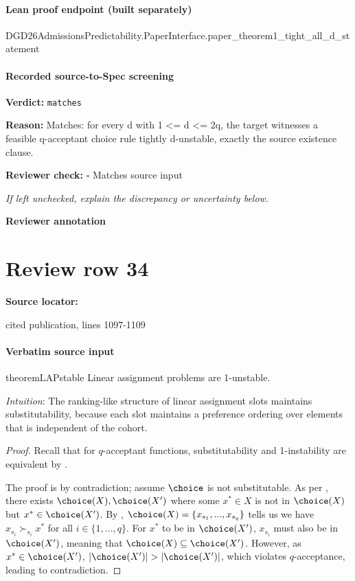 \documentclass[10pt]{article}
\newcommand{\reviewerbox}{%
  \par\noindent\fbox{\parbox{0.96\linewidth}{\rule{0pt}{0.38in}}}\par
}
\newcommand{\reviewmatch}[1]{%
  \par\noindent\textbf{Reviewer check:} $\square$\; #1\par
  \noindent\emph{If left unchecked, explain the discrepancy or uncertainty below.}\par
}
\begin{document}
\paragraph{Lean proof endpoint (built separately)}\begin{ReviewVerbatim}
DGD26AdmissionsPredictability.PaperInterface.paper_theorem1_tight_all_d_statement
\end{ReviewVerbatim}

\paragraph{Recorded source-to-Spec screening}
\textbf{Verdict:} \texttt{matches}
\\
{\raggedright
\textbf{Reason:} Matches:\allowbreak{} for every d with 1 <= d <= 2q, the target witnesses a feasible q-\allowbreak{}acceptant choice rule tightly d-\allowbreak{}unstable, exactly the source existence clause.\allowbreak{}
\par}
\reviewmatch{Matches source input}
\noindent\textbf{Reviewer annotation}\par
\reviewerbox
\clearpage
\hypertarget{source-claim-b3ee09f1e9e6b10d}{}
\section*{Review row 34}
\textbf{Source locator:} {\footnotesize\raggedright cited publication, lines 1097-\allowbreak{}1109\par}
\paragraph{Verbatim source input}
\begin{ReviewVerbatim}
\begin{restatable}{theorem}{LAPstable}
\label{thm:lap-unstable}
Linear assignment problems are 1-unstable.
\end{restatable}

\textit{Intuition}: The ranking-like structure of linear assignment slots maintains substitutability, because each slot maintains a  preference ordering over elements that is independent of the cohort.

\begin{proof}
Recall that for $q$-acceptant functions, substitutability and 1-instability are equivalent by .

The proof is by contradiction; assume $\choice$ is not substitutable. As per , there exists $\choice(X), \choice(X')$ where some $x^* \in X$ is not in $\choice(X)$ but $x^* \in \choice(X')$.
By , $\choice(X) = \{x_{s_1}, ..., x_{s_q}\}$ tells us we have $x_{s_i} \succ_{s_i} x^*$ for all $i \in \{1, ..., q\}$. For $x^*$ to be in $\choice(X')$, $x_{s_i}$ must also be in $\choice(X')$, meaning that $\choice(X) \subseteq \choice(X')$. However, as $x^* \in \choice(X')$, $|\choice(X')| > |\choice(X')|$, which violates $q$-acceptance, leading to contradiction.
\end{proof}
\end{ReviewVerbatim}
\end{document}
